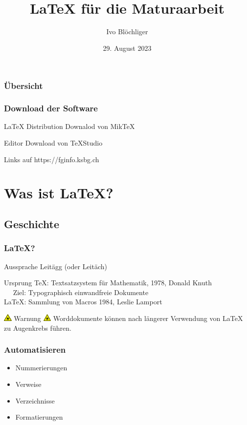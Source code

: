 \documentclass{beamer}
\title{\LaTeX{} für die Maturaarbeit}
\author{Ivo Blöchliger}
\institute{Kantonsschule am Burggraben}
\date{29. August 2023}
\begin{document}
\frame{\titlepage}

\begin{frame}
\frametitle{Übersicht}
\tableofcontents
\end{frame}

\begin{frame}
	\frametitle{Download der Software}
	\begin{block}{\LaTeX{} Distribution}
		Downalod von Mik\TeX
	\end{block}
	\begin{block}{Editor}
		Download von \TeX{}Studio
	\end{block}
	Links auf https://fginfo.ksbg.ch
\end{frame}

\section{Was ist \LaTeX{}?}
\subsection{Geschichte}
\begin{frame}
	\frametitle{\LaTeX{}?}
	\begin{block}{Aussprache}
		Leitägg (oder Leitäch)
	\end{block}
	\begin{block}{Ursprung}
		\TeX{}: Textsatzsystem für Mathematik, 
		1978, Donald Knuth \\ 
		$\quad$ Ziel: Typographisch einwandfreie Dokumente\\[2mm]
		\LaTeX{}: Sammlung von Macros
		1984, Leslie Lamport
	\end{block}
	\begin{alertblock}{\includegraphics[height=1em]{images/Laser-symbol.pdf}
		Warnung \includegraphics[height=1em]{images/Laser-symbol.pdf}}
		Worddokumente können nach längerer Verwendung von \LaTeX{} zu Augenkrebs
		führen.
	\end{alertblock}
\end{frame}





\begin{frame}
	\frametitle{Automatisieren}
	\begin{itemize}
		\item Nummerierungen
		\item Verweise
		\item Verzeichnisse
		\item Formatierungen
	\end{itemize}
\end{frame}
\end{document}
